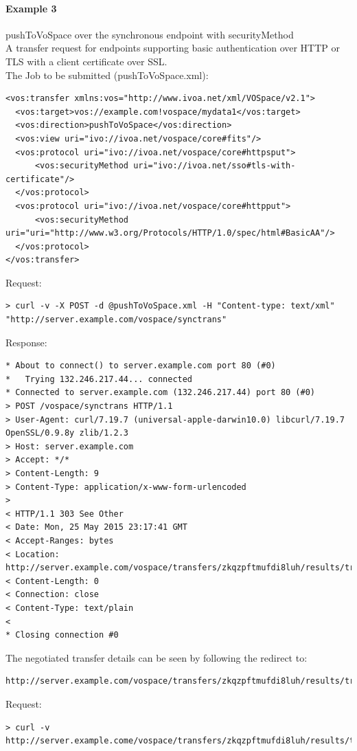 \documentclass[11pt,a4paper]{ivoa}
\begin{document}
\paragraph{Example 3}
pushToVoSpace over the synchronous endpoint with securityMethod
\\[5px]
\noindent
A transfer request for endpoints supporting basic authentication over HTTP or TLS with a client certificate over SSL.\\
The Job to be submitted (pushToVoSpace.xml):
\begin{lstlisting}
<vos:transfer xmlns:vos="http://www.ivoa.net/xml/VOSpace/v2.1">
  <vos:target>vos://example.com!vospace/mydata1</vos:target>
  <vos:direction>pushToVoSpace</vos:direction>
  <vos:view uri="ivo://ivoa.net/vospace/core#fits"/>
  <vos:protocol uri="ivo://ivoa.net/vospace/core#httpsput">
      <vos:securityMethod uri="ivo://ivoa.net/sso#tls-with-certificate"/>
  </vos:protocol>
  <vos:protocol uri="ivo://ivoa.net/vospace/core#httpput">
      <vos:securityMethod uri="uri="http://www.w3.org/Protocols/HTTP/1.0/spec/html#BasicAA"/>
  </vos:protocol>
</vos:transfer>
\end{lstlisting}
Request:
\begin{lstlisting}
> curl -v -X POST -d @pushToVoSpace.xml -H "Content-type: text/xml" "http://server.example.com/vospace/synctrans"
\end{lstlisting}
Response:
\begin{lstlisting}
* About to connect() to server.example.com port 80 (#0)
*   Trying 132.246.217.44... connected
* Connected to server.example.com (132.246.217.44) port 80 (#0)
> POST /vospace/synctrans HTTP/1.1
> User-Agent: curl/7.19.7 (universal-apple-darwin10.0) libcurl/7.19.7 OpenSSL/0.9.8y zlib/1.2.3
> Host: server.example.com
> Accept: */*
> Content-Length: 9
> Content-Type: application/x-www-form-urlencoded
>
< HTTP/1.1 303 See Other
< Date: Mon, 25 May 2015 23:17:41 GMT
< Accept-Ranges: bytes
< Location: http://server.example.com/vospace/transfers/zkqzpftmufdi8luh/results/transferDetails
< Content-Length: 0
< Connection: close
< Content-Type: text/plain
<
* Closing connection #0
\end{lstlisting}
The negotiated transfer details can be seen by following the redirect to:
\begin{lstlisting}
http://server.example.com/vospace/transfers/zkqzpftmufdi8luh/results/transferDetails
\end{lstlisting}
Request:
\begin{lstlisting}
> curl -v http://server.example.come/vospace/transfers/zkqzpftmufdi8luh/results/transferDetails
\end{lstlisting}
\end{document}
